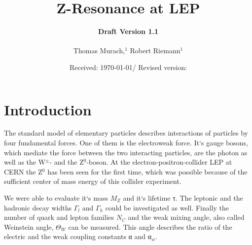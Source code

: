 \documentclass[epj,nopacs]{svjour}
\begin{document}
\hugehead

\newcommand{\dd}[1]{\mathrm{d}#1\,} %
\newcommand{\lref}[1]{listing (\ref{lst:#1})} %
\newcommand{\fref}[1]{fig. (\ref{fig:#1})} %
\newcommand{\tref}[1]{tab. (\ref{tab:#1})} %
\newcommand{\eref}[1]{eq. (\ref{eqn:#1})} %

\title{Z-Resonance at LEP}
\author{{\bf Draft Version 1.1}\\
\medskip \\
Thomas Murach,$^{1}$
Robert Riemann$^{1}$
} 
\date{Received: \today / Revised version:}
\maketitle

\vspace*{-1.5cm}
\section{ Introduction}
\baselineskip=0.38cm
\vspace*{1.cm}

The standard model of elementary particles describes interactions of particles
by four fundamental forces. One of them is the electroweak force. It`s gauge
bosons, which mediate the force between the two interacting particles, are the
photon as well as the W$^{\pm}$- and the Z$^0$-boson. At the
electron-positron-collider LEP at CERN the Z$^0$ has been seen for the first
time, which was possible because of the sufficient center of mass energy of this
collider experiment.

We were able to evaluate it`s mass $M_Z$ and it`s lifetime τ. The leptonic and
the hadronic decay widths $Γ_l$ and $Γ_h$ could be investigated as well. Finally
the number of quark and lepton families $N_C$ and the weak mixing angle, also
called Weinstein angle, $\Theta_W$ can be measured. This angle describes the
ratio of the electric and the weak coupling constants α and α$_w$.
\end{document}
